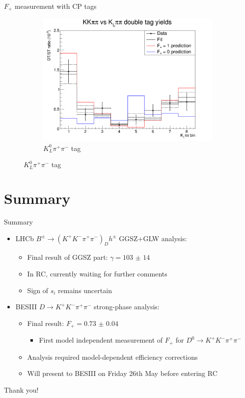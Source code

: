 \documentclass{beamer}
\begin{document}
\begin{frame}{$F_+$ measurement with CP tags}
\begin{figure}
\begin{subfigure}{0.35\textwidth}
      \includegraphics[width = 1.0\textwidth]{Plots/CPeven_fraction_combination_KLpipi.png}
      \caption{$K^0_L\pi^+\pi^-$ tag}
    \end{subfigure}
  \end{figure}
\end{frame}

\section{Summary}

\begin{frame}{Summary}
  \begin{itemize}
    \setlength\itemsep{1.5em}
    \item{LHCb $B^\pm\to(K^+K^-\pi^+\pi^-)_Dh^\pm$ GGSZ+GLW analysis:}
    \begin{itemize}
      \setlength\itemsep{0.5em}
      \item{Final result of GGSZ part: $\gamma = \SI{103(14)}{}$}
      \item{In RC, currently waiting for further comments}
      \item{Sign of $s_i$ remains uncertain}
    \end{itemize}
    \item{BESIII $D\to K^+K^-\pi^+\pi^-$ strong-phase analysis:}
    \begin{itemize}
      \setlength\itemsep{0.5em}
      \item{Final result: $F_+ = \SI{0.73(4)}{}$}
      \begin{itemize}
        \item{First model independent measurement of $F_+$ for $D^0\to K^+K^-\pi^+\pi^-$}
      \end{itemize}
      \item{Analysis required model-dependent efficiency corrections}
      \item{Will present to BESIII on Friday 26th May before entering RC}
    \end{itemize}
  \end{itemize}
  \begin{center}
    \huge Thank you!
  \end{center}
\end{frame}
\end{document}
